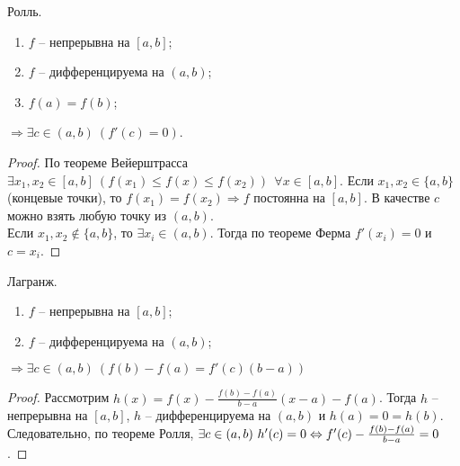     \begin{theorem}{Ролль.}
        \begin{enumerate}
            \item $f$ -- непрерывна на $[a, b]$;
            \item $f$ -- дифференцируема на $(a,b)$;
            \item $f(a) = f(b)$;
        \end{enumerate}
        $\Rightarrow \exists c \in (a,b) \ (f'(c) = 0)$.
    \end{theorem}
    
    \begin{proof}
        По теореме Вейерштрасса $\exists x_{1}, x_{2} \in [a, b] \ (f(x_{1}) \leq f(x) \leq f(x_{2})) \ \ \forall x \in [a, b]$.
        Если $x_{1}, x_{2} \in \{a,b\}$ (концевые точки), то $f(x_{1})=f(x_{2}) \Rightarrow f$ постоянна на $[a, b]$. В качестве $c$ можно взять любую точку из $(a,b)$.
        \\
        Если $x_{1}, x_{2} \notin \{a,b\}$, то $\exists x_{i} \in (a,b)$. Тогда по теореме Ферма $f'(x_{i}) = 0$ и $c = x_{i}$.
    \end{proof}
    
    \begin{theorem}{Лагранж.}
        \begin{enumerate}
            \item $f$ -- непрерывна на $[a, b]$;
            \item $f$ -- дифференцируема на $(a,b)$;
        \end{enumerate}
        $\Rightarrow \exists c \in (a,b) \ (f(b) - f(a) = f'(c)(b-a))$
    \end{theorem}
    
    \begin{proof}
        Рассмотрим $h(x) = f(x) - \frac{f(b) - f(a)}{b - a}(x - a) - f(a)$. Тогда $h$ -- непрерывна на $[a, b]$, $h$ -- дифференцируема на $(a,b)$ и $h(a) = 0 = h(b)$.\\
        Следовательно, по теореме Ролля, $\exists c \in (a,b) \ h'(c) = 0 \Leftrightarrow f'(c) - \frac{f(b) - f(a)}{b - a} = 0$.
    \end{proof}
    
